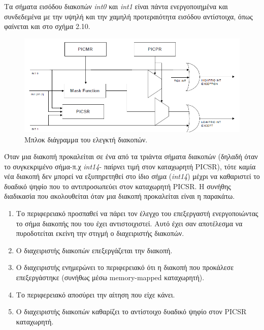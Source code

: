 \documentclass[a4paper,10pt]{article}
\numberwithin{figure}{section}
\numberwithin{table}{section}
\begin{document}
Τα σήματα εισόδου διακοπών \emph{int0} και \emph{int1} είναι πάντα ενεργοποιημένα και συνδεδεμένα 
με την υψηλή και την χαμηλή προτεραιότητα εισόδου ​​αντίστοιχα, όπως φαίνεται και στο σχήμα 2.10.


\vspace{0.7cm}
\begin{figure}[h!]
 \centering
 \includegraphics[bb=0 0 845 367,scale=0.38]{./Images/inter_controller.png}
 \caption{Μπλοκ διάγραμμα του ελεγκτή διακοπών.}
\end{figure}
\vspace{0.7cm}
\newpage
Όταν μια διακοπή προκαλείται σε ένα από τα τριάντα σήματα διακοπών (δηλαδή όταν το συγκεκριμένο σήμα-π.χ \emph{int14}- παίρνει τιμή στον καταχωρητή PICSR), τότε καμία νέα διακοπή δεν μπορεί να εξυπηρετηθεί στο ίδιο σήμα (\emph{int14}) μέχρι να καθαριστεί το δυαδικό ψηφίο που το αντιπροσωπεύει στον καταχωρητή PICSR.  Η συνήθης διαδικασία που ακολουθείται όταν μια διακοπή προκαλείται είναι η παρακάτω.
\begin{enumerate}
 \item Το περιφερειακό προσπαθεί να πάρει τον έλεγχο του επεξεργαστή ενεργοποιώντας το σήμα διακοπής που του έχει αντιστοιχιστεί. Αυτό έχει σαν αποτέλεσμα να πυροδοτείται εκείνη την στιγμή ο διαχειριστής διακοπών.
 \item Ο διαχειριστής διακοπών επεξεργάζεται την διακοπή.
 \item Ο διαχειριστής ενημερώνει το περιφερειακό ότι η διακοπή που προκάλεσε επεξεργάστηκε (συνήθως μέσω memory-mapped καταχωρητή).
 \item Το περιφερειακό αποσύρει την αίτηση που είχε κάνει.
 \item Ο διαχειριστής διακοπών καθαρίζει το αντίστοιχο δυαδικό ψηφίο στον PICSR καταχωρητή.
\end{enumerate}
\end{document}

